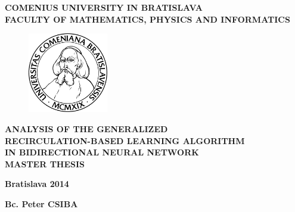 \begin{center}
    \large{
        \textbf{
            COMENIUS UNIVERSITY IN BRATISLAVA \\ 
            FACULTY OF MATHEMATICS, PHYSICS AND INFORMATICS
        }
    }
\end{center}

\vspace{2cm}

\begin{figure}[!h]
    \centering
    \includegraphics[width=3.5cm]{img/komlogo-new}
\end{figure}

\vspace{1cm}

\begin{center}
    \large{
        \textbf{
            ANALYSIS OF THE GENERALIZED \\
            RECIRCULATION-BASED LEARNING ALGORITHM \\
            IN BIDIRECTIONAL NEURAL NETWORK \\
            \vspace{3cm}
            MASTER THESIS
        }
    }
\end{center}

\vfill

\begin{multicols}{2}
    \begin{flushleft}
        \textbf{Bratislava 2014}
    \end{flushleft}
    \begin{flushright}
        \textbf{Bc. Peter CSIBA}
    \end{flushright}
\end{multicols}

